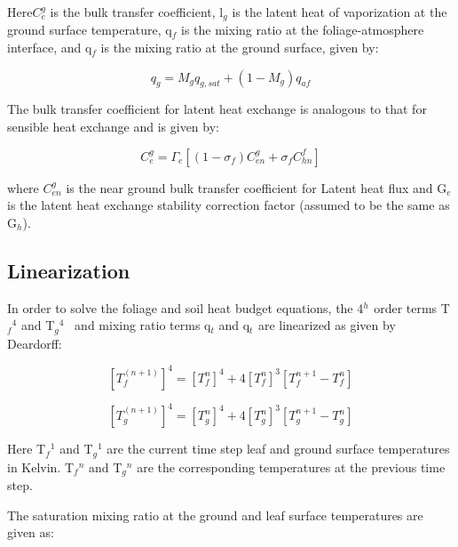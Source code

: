 Here\(C_e^g\) is the bulk transfer coefficient, l\(_{g}\) is the latent heat of vaporization at the ground surface temperature, q\(_{f}\) is the mixing ratio at the foliage-atmosphere interface, and q\(_{f}\) is the mixing ratio at the ground surface, given by:

\begin{equation}
{q_g} = {M_g}{q_{g,sat}} + \left( {1 - {M_g}} \right){q_{af}}
\end{equation}

The bulk transfer coefficient for latent heat exchange is analogous to that for sensible heat exchange and is given by:

\begin{equation}
C_e^g = {\Gamma_e}\left[ {\left( {1 - {\sigma_f}} \right)C_{en}^g + {\sigma_f}C_{hn}^f} \right]
\end{equation}

where \(C_{en}^g\) is the near ground bulk transfer coefficient for Latent heat flux and G\(_{e}\) is the latent heat exchange stability correction factor (assumed to be the same as G\(_{h}\)).

\subsection{Linearization}\label{linearization}

In order to solve the foliage and soil heat budget equations, the 4\(^{h}\) \(^{ }\)order terms T\(_{f}\)\(^{4}\) and T\(_{g}\)\(^{4}\) ~and mixing ratio terms q\(_{t}\) and q\(_{t}\) \(_{ }\)are linearized as given by Deardorff:

\begin{equation}
{\left[ {T_f^{\left( {n + 1} \right)}} \right]^4} = {\left[ {T_f^n} \right]^4} + 4{\left[ {T_f^n} \right]^3}\left[ {T_f^{n + 1} - T_f^n} \right]
\end{equation}

\begin{equation}
{\left[ {T_g^{\left( {n + 1} \right)}} \right]^4} = {\left[ {T_g^n} \right]^4} + 4{\left[ {T_g^n} \right]^3}\left[ {T_g^{n + 1} - T_g^n} \right]
\end{equation}

Here T\(_{f}\)\(^{1}\) and T\(_{g}\)\(^{1}\) are the current time step leaf and ground surface temperatures in Kelvin. T\(_{f}\)\(^{n}\) and T\(_{g}\)\(^{n}\) are the corresponding temperatures at the previous time step.

The saturation mixing ratio at the ground and leaf surface temperatures are given as:

